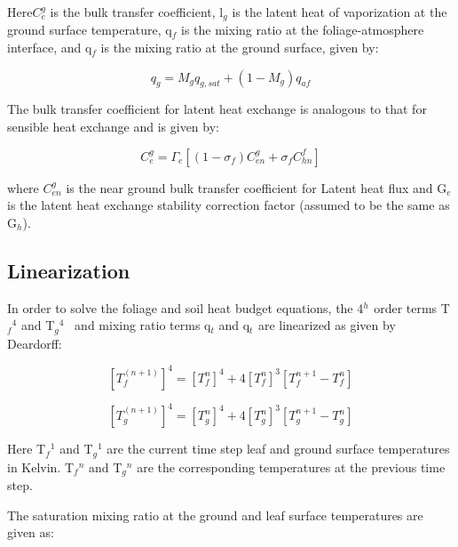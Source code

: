 Here\(C_e^g\) is the bulk transfer coefficient, l\(_{g}\) is the latent heat of vaporization at the ground surface temperature, q\(_{f}\) is the mixing ratio at the foliage-atmosphere interface, and q\(_{f}\) is the mixing ratio at the ground surface, given by:

\begin{equation}
{q_g} = {M_g}{q_{g,sat}} + \left( {1 - {M_g}} \right){q_{af}}
\end{equation}

The bulk transfer coefficient for latent heat exchange is analogous to that for sensible heat exchange and is given by:

\begin{equation}
C_e^g = {\Gamma_e}\left[ {\left( {1 - {\sigma_f}} \right)C_{en}^g + {\sigma_f}C_{hn}^f} \right]
\end{equation}

where \(C_{en}^g\) is the near ground bulk transfer coefficient for Latent heat flux and G\(_{e}\) is the latent heat exchange stability correction factor (assumed to be the same as G\(_{h}\)).

\subsection{Linearization}\label{linearization}

In order to solve the foliage and soil heat budget equations, the 4\(^{h}\) \(^{ }\)order terms T\(_{f}\)\(^{4}\) and T\(_{g}\)\(^{4}\) ~and mixing ratio terms q\(_{t}\) and q\(_{t}\) \(_{ }\)are linearized as given by Deardorff:

\begin{equation}
{\left[ {T_f^{\left( {n + 1} \right)}} \right]^4} = {\left[ {T_f^n} \right]^4} + 4{\left[ {T_f^n} \right]^3}\left[ {T_f^{n + 1} - T_f^n} \right]
\end{equation}

\begin{equation}
{\left[ {T_g^{\left( {n + 1} \right)}} \right]^4} = {\left[ {T_g^n} \right]^4} + 4{\left[ {T_g^n} \right]^3}\left[ {T_g^{n + 1} - T_g^n} \right]
\end{equation}

Here T\(_{f}\)\(^{1}\) and T\(_{g}\)\(^{1}\) are the current time step leaf and ground surface temperatures in Kelvin. T\(_{f}\)\(^{n}\) and T\(_{g}\)\(^{n}\) are the corresponding temperatures at the previous time step.

The saturation mixing ratio at the ground and leaf surface temperatures are given as:

